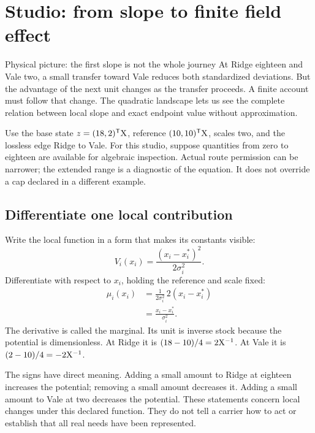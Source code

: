 \chapter{Studio: from slope to finite field effect}\label{ch:studio-field}

\begin{intuitionbox}{Physical picture: the first slope is not the whole journey}
At Ridge eighteen and Vale two, a small transfer toward Vale reduces both standardized deviations. But the advantage of the next unit changes as the transfer proceeds. A finite account must follow that change. The quadratic landscape lets us see the complete relation between local slope and exact endpoint value without approximation.
\end{intuitionbox}

Use the base state \(z=(18,2)^{\mathsf T}\mathrm{X}\), reference \((10,10)^{\mathsf T}\mathrm{X}\), scales two, and the lossless edge Ridge to Vale. For this studio, suppose quantities from zero to eighteen are available for algebraic inspection. Actual route permission can be narrower; the extended range is a diagnostic of the equation. It does not override a cap declared in a different example.

\section{Differentiate one local contribution}

Write the local function in a form that makes its constants visible:
\begin{equation}
V_i(x_i)=\frac{(x_i-x_i^*)^2}{2\sigma_i^2}.
\end{equation}
Differentiate with respect to \(x_i\), holding the reference and scale fixed:
\begin{align}
\mu_i(x_i)
&=\frac{1}{2\sigma_i^2}\,2(x_i-x_i^*)\\
&=\frac{x_i-x_i^*}{\sigma_i^2}.
\end{align}
The derivative is called the marginal. Its unit is inverse stock because the potential is dimensionless. At Ridge it is \((18-10)/4=2\mathrm{X}^{-1}\). At Vale it is \((2-10)/4=-2\mathrm{X}^{-1}\).

The signs have direct meaning. Adding a small amount to Ridge at eighteen increases the potential; removing a small amount decreases it. Adding a small amount to Vale at two decreases the potential. These statements concern local changes under this declared function. They do not tell a carrier how to act or establish that all real needs have been represented.

